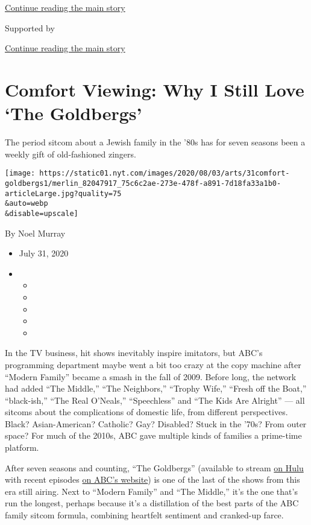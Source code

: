 \protect\hyperlink{after-top}{Continue reading the main story}

Supported by

\protect\hyperlink{after-sponsor}{Continue reading the main story}

\hypertarget{comfort-viewing-why-i-still-love-the-goldbergs}{%
\section{Comfort Viewing: Why I Still Love `The
Goldbergs'}\label{comfort-viewing-why-i-still-love-the-goldbergs}}

The period sitcom about a Jewish family in the '80s has for seven
seasons been a weekly gift of old-fashioned zingers.

\texttt{[image: https://static01.nyt.com/images/2020/08/03/arts/31comfort-goldbergs1/merlin\_82047917\_75c6c2ae-273e-478f-a891-7d18fa33a1b0-articleLarge.jpg?quality=75\\\&auto=webp\\\&disable=upscale]}

By Noel Murray

\begin{itemize}
\item
  July 31, 2020
\item
  \begin{itemize}
  \item
  \item
  \item
  \item
  \item
  \end{itemize}
\end{itemize}

In the TV business, hit shows inevitably inspire imitators, but ABC's
programming department maybe went a bit too crazy at the copy machine
after ``Modern Family'' became a smash in the fall of 2009. Before long,
the network had added ``The Middle,'' ``The Neighbors,'' ``Trophy
Wife,'' ``Fresh off the Boat,'' ``black-ish,'' ``The Real O'Neals,''
``Speechless'' and ``The Kids Are Alright'' --- all sitcoms about the
complications of domestic life, from different perspectives. Black?
Asian-American? Catholic? Gay? Disabled? Stuck in the '70s? From outer
space? For much of the 2010s, ABC gave multiple kinds of families a
prime-time platform.

After seven seasons and counting, ``The Goldbergs'' (available to stream
\href{https://www.hulu.com/series/the-goldbergs-a43a85fb-d4c8-4d11-9c28-070153643bec}{on
Hulu} with recent episodes \href{https://abc.com/shows/the-goldbergs}{on
ABC's website}) is one of the last of the shows from this era still
airing. Next to ``Modern Family'' and ``The Middle,'' it's the one
that's run the longest, perhaps because it's a distillation of the best
parts of the ABC family sitcom formula, combining heartfelt sentiment
and cranked-up farce.

